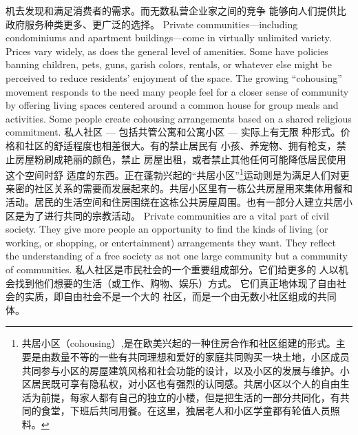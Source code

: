 \begin{paracol}{2}
机去发现和满足消费者的需求。而无数私营企业家之间的竞争
能够向人们提供比政府服务种类更多、更广泛的选择。
\switchcolumn*
Private communities---including condominiums and apartment buildings---come in virtually unlimited variety. Prices vary
widely, as does the general level of amenities. Some have policies
banning children, pets, guns, garish colors, rentals, or whatever
else might be perceived to reduce residents' enjoyment of the
space. The growing ``cohousing'' movement responds to the
need many people feel for a closer sense of community by offering living spaces centered around a common house for group
meals and activities. Some people create cohousing arrangements based on a shared religious commitment.
\switchcolumn
私人社区 --- 包括共管公寓和公寓小区 --- 实际上有无限
种形式。价格和社区的舒适程度也相差很大。有的禁止居民有
小孩、养宠物、拥有枪支，禁止房屋粉刷成艳丽的颜色，禁止
房屋出租，或者禁止其他任何可能降低居民使用这个空间时舒
适度的东西。正在蓬勃兴起的“共居小区”\footnote{共居小区（cohousing）,是在欧美兴起的一种住房合作和社区组建的形式。主要是由数量不等的一些有共同理想和爱好的家庭共同购买一块土地，小区成员共同参与小区的房屋建筑风格和社会功能的设计，以及小区的发展与维护。小区居民既可享有隐私权，对小区也有强烈的认同感。共居小区以个人的自由生活为前提，每家人都有自己的独立的小楼，但是把生活的一部分共同化，有共同的食堂，下班后共同用餐。在这里，独居老人和小区学童都有轮值人员照料。}运动则是为满足人们对更亲密的社区关系的需要而发展起来的。共居小区里有一栋公共房屋用来集体用餐和活动。居民的生活空间和住房围绕在这栋公共房屋周围。也有一部分人建立共居小区是为了进行共同的宗教活动。
\switchcolumn*
Private communities are a vital part of civil society. They give
more people an opportunity to find the kinds of living (or working, or shopping, or entertainment) arrangements they want.
They reflect the understanding of a free society as not one large
community but a community of communities.
\switchcolumn
私人社区是市民社会的一个重要组成部分。它们给更多的
人以机会找到他们想要的生活（或工作、购物、娱乐）方式。
它们真正地体现了自由社会的实质，即自由社会不是一个大的
社区，而是一个由无数小社区组成的共同体。


\end{paracol}
